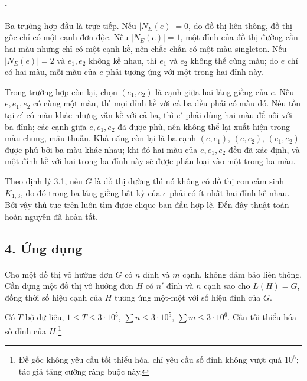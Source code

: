 \documentclass[11pt]{article}
\begin{document}
\paragraph{.}
Ba trường hợp đầu là trực tiếp. Nếu \(|N_E(e)|=0\), do đồ thị liên thông, đồ
thị gốc chỉ có một cạnh đơn độc. Nếu \(|N_E(e)|=1\), một đỉnh của đồ thị đường
cần hai màu nhưng chỉ có một cạnh kề, nên chắc chắn có một màu singleton. Nếu
\(|N_E(e)|=2\) và \(e_1,e_2\) không kề nhau, thì \(e_1\) và \(e_2\) không thể
cùng màu; do \(e\) chỉ có hai màu, mỗi màu của \(e\) phải tương ứng với một
trong hai đỉnh này.

Trong trường hợp còn lại, chọn \((e_1,e_2)\) là cạnh giữa hai láng giềng của
\(e\). Nếu \(e,e_1,e_2\) có cùng một màu, thì mọi đỉnh kề với cả ba đều phải có
màu đó. Nếu tồn tại \(e'\) có màu khác nhưng vẫn kề với cả ba, thì \(e'\) phải
dùng hai màu để nối với ba đỉnh; các cạnh giữa \(e,e_1,e_2\) đã được phủ, nên
không thể lại xuất hiện trong màu chung, mâu thuẫn. Khả năng còn lại là ba cạnh
\((e,e_1)\), \((e,e_2)\), \((e_1,e_2)\) được phủ bởi ba màu khác nhau; khi đó
hai màu của \(e,e_1,e_2\) đều đã xác định, và một đỉnh kề với hai trong ba đỉnh
này sẽ được phân loại vào một trong ba màu.

Theo định lý 3.1, nếu \(G\) là đồ thị đường thì nó không có đồ thị con cảm sinh
\(K_{1,3}\), do đó trong ba láng giềng bất kỳ của \(e\) phải có ít nhất hai
đỉnh kề nhau. Bởi vậy thủ tục trên luôn tìm được clique ban đầu hợp lệ. Đến
đây thuật toán hoàn nguyên đã hoàn tất.

\subsection*{4. Ứng dụng}

\paragraph{}
Cho một đồ thị vô hướng đơn \(G\) có \(n\) đỉnh và \(m\) cạnh, không đảm bảo
liên thông. Cần dựng một đồ thị vô hướng đơn \(H\) có \(n'\) đỉnh và \(n\) cạnh
sao cho \(L(H)=G\), đồng thời số hiệu cạnh của \(H\) tương ứng một-một với số
hiệu đỉnh của \(G\).

Có \(T\) bộ dữ liệu, \(1\le T\le 3\cdot 10^5\),
\(\sum n\le 3\cdot 10^5\), \(\sum m\le 3\cdot 10^6\). Cần tối thiểu hóa số
đỉnh của \(H\).\footnote{Đề gốc không yêu cầu tối thiểu hóa, chỉ yêu cầu số
đỉnh không vượt quá \(10^6\); tác giả tăng cường ràng buộc này.}
\end{document}

